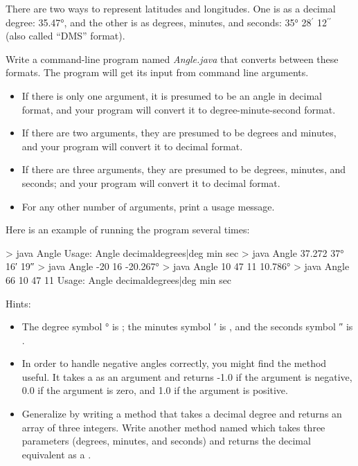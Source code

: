 \begin{exercise}
There are two ways to represent latitudes and longitudes. One is as a decimal degree: 35.47°, and the other is as degrees, minutes, and seconds: 35° 28$^\prime$ 12$^{\prime\prime}$ (also called ``DMS'' format).

Write a command-line program named {\em Angle.java} that converts between these formats. The program will get its input from command line arguments.

\begin{itemize}
\item If there is only one argument, it is presumed to be an angle in decimal format, and your program will convert it to degree-minute-second format.
\item If there are two arguments, they are presumed to be degrees and minutes, and your program will convert it to decimal format.
\item If there are three arguments, they are presumed to be degrees, minutes, and seconds; and your program will convert it to decimal format.
\item For any other number of arguments, print a usage message.
\end{itemize}

Here is an example of running the program several times:

\begin{stdout}
> java Angle
Usage: Angle decimaldegrees|deg min sec
> java Angle 37.272
37° 16′ 19″
> java Angle -20 16
-20.267°
> java Angle 10 47 11
10.786°
> java Angle 66 10 47 11
Usage: Angle decimaldegrees|deg min sec
\end{stdout}

Hints:
\begin{itemize}
\item The degree symbol ° is ; the minutes symbol ′ is , and the seconds symbol ″ is .
\item In order to handle negative angles correctly, you might find the  method useful. It takes a  as an argument and returns -1.0 if the argument is negative, 0.0 if the argument is zero, and 1.0 if the argument is positive.
\item Generalize by writing a  method that takes a decimal degree and returns an array of three integers. Write another method named  which takes three parameters (degrees, minutes, and seconds) and returns the decimal equivalent as a .
\end{itemize}

\end{exercise}

